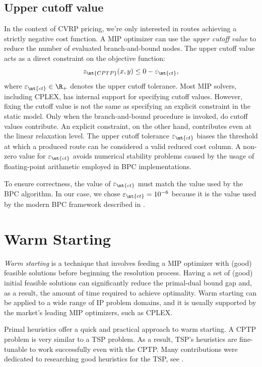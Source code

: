 \subsection{Upper cutoff value}
\label{sec:impl-upper-cutoff-value}

In the context of CVRP pricing, we're only interested in routes achieving a strictly negative cost function.
A MIP optimizer can use the \textit{upper cutoff value} to reduce the number of evaluated branch-and-bound nodes.
The upper cutoff value acts as a direct constraint on the objective function:
\begin{equation}
	z_\mt{CPTP}(x, y) \le 0 - \varepsilon_{\mt{ct}},
\end{equation}
where $\varepsilon_{\mt{ct}} \in \R_+$ denotes the upper cutoff tolerance.
Most MIP solvers, including CPLEX, has internal support for specifying cutoff values.
However, fixing the cutoff value is not the same as specifying an explicit constraint in the static model.
Only when the branch-and-bound procedure is invoked, do cutoff values contribute.
An explicit constraint, on the other hand, contributes even at the linear relaxation level.
The upper cutoff tolerance $\varepsilon_{\mt{ct}}$ biases the threshold at which a produced route
can be considered a valid reduced cost column.
A non-zero value for $\varepsilon_{\mt{ct}}$ avoids numerical
stability problems caused by the usage of floating-point arithmetic
employed in BPC implementations.

To ensure correctness, the value of $\varepsilon_{\mt{ct}}$ must match the value used by the BPC algorithm.
In our case, we chose $\varepsilon_{\mt{ct}} = 10^{-6}$ because it is the value used by the modern BPC framework described in \textcite{sadykov2021}.

\section{Warm Starting}
\label{sec:impl-warm-starting}

\textit{Warm starting} is a technique that involves feeding
a MIP optimizer with (good) feasible solutions
before beginning the resolution process.
Having a set of (good) initial feasible solutions
can significantly reduce the primal-dual bound gap and,
as a result, the amount of time required to achieve optimality.
Warm starting can be applied to a wide range of IP problem domains,
and it is usually supported by the market's leading MIP optimizers,
such as CPLEX.

Primal heuristics offer a quick and practical approach to warm starting.
A CPTP problem is very similar to a TSP problem.
As a result, TSP's heuristics are fine-tunable to work successfully even with the CPTP.
Many contributions were dedicated to researching good heuristics for the TSP,
see \cite{rosenkrantz1977, johnson1997, laporte1992, johnson2007, hoffman2013}.


